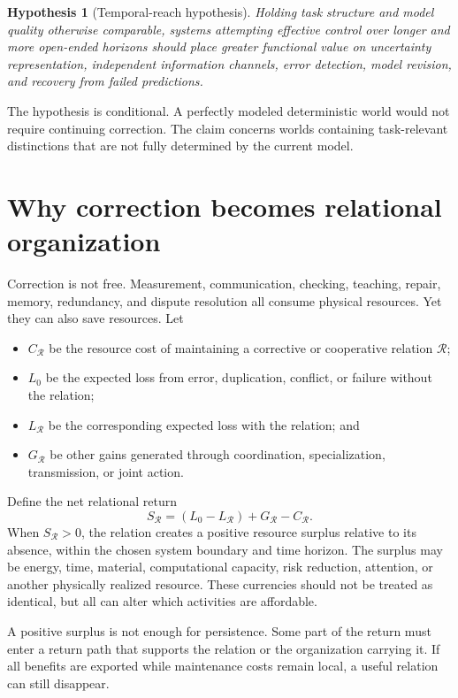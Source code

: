 \documentclass[11pt,a4paper]{article}
\newtheorem{hypothesis}{Hypothesis}
\newcommand{\R}{\mathcal{R}}
\begin{document}
\begin{hypothesis}[Temporal-reach hypothesis]
Holding task structure and model quality otherwise comparable, systems attempting effective control over longer and more open-ended horizons should place greater functional value on uncertainty representation, independent information channels, error detection, model revision, and recovery from failed predictions.
\end{hypothesis}

The hypothesis is conditional. A perfectly modeled deterministic world would not require continuing correction. The claim concerns worlds containing task-relevant distinctions that are not fully determined by the current model.

\section{Why correction becomes relational organization}

Correction is not free. Measurement, communication, checking, teaching, repair, memory, redundancy, and dispute resolution all consume physical resources. Yet they can also save resources. Let
\begin{itemize}
  \item $C_{\R}$ be the resource cost of maintaining a corrective or cooperative relation $\R$;
  \item $L_0$ be the expected loss from error, duplication, conflict, or failure without the relation;
  \item $L_{\R}$ be the corresponding expected loss with the relation; and
  \item $G_{\R}$ be other gains generated through coordination, specialization, transmission, or joint action.
\end{itemize}
Define the net relational return
\[
S_{\R} = (L_0-L_{\R}) + G_{\R} - C_{\R}.
\]
When $S_{\R}>0$, the relation creates a positive resource surplus relative to its absence, within the chosen system boundary and time horizon. The surplus may be energy, time, material, computational capacity, risk reduction, attention, or another physically realized resource. These currencies should not be treated as identical, but all can alter which activities are affordable.

A positive surplus is not enough for persistence. Some part of the return must enter a return path that supports the relation or the organization carrying it. If all benefits are exported while maintenance costs remain local, a useful relation can still disappear.
\end{document}
